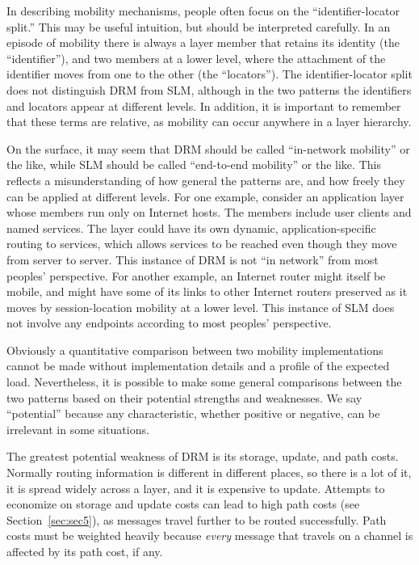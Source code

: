 In describing mobility mechanisms, people often focus on the
``identifier-locator split.''
This may be useful intuition, but should be interpreted carefully.
In an episode of mobility there is always a layer member that retains
its identity (the ``identifier''), and two members at a lower level,
where the attachment of the identifier moves from one to the other
(the ``locators'').
The identifier-locator split
does not distinguish DRM from SLM, although in the two patterns
the identifiers and locators appear at different levels.
In addition, it is important to remember that these terms are
relative, as mobility can occur anywhere in a layer hierarchy. 

On the surface, it may seem that DRM should be called ``in-network
mobility'' or the like, while SLM should be called ``end-to-end mobility''
or the like.
This reflects a misunderstanding of how general the patterns are,
and how freely they can be applied at different levels.
For one example, consider an application layer whose members run
only on Internet
hosts.
The members include user clients and named services.
The layer could have its own dynamic,
application-specific routing to services,
which allows services to be reached even though they move from server
to server.
This instance of DRM is not ``in network'' from most peoples' perspective.
For another example, an Internet router might itself be mobile,
and might have some of its links to other Internet routers
preserved as it moves by session-location
mobility at a lower level.
This instance of SLM does not involve any endpoints according to most
peoples' perspective.

Obviously a quantitative comparison between two mobility implementations
cannot be made without implementation details and a profile of the
expected load.
Nevertheless, it is possible to make some general comparisons
between the two patterns based on their potential strengths and 
weaknesses.
We say ``potential'' because any characteristic, whether positive or
negative, can be irrelevant in some situations.

The greatest potential
weakness of DRM is its storage, update, and path costs.
Normally routing information is different in different places,
so there is a lot of it, it is spread widely across a layer, and it
is expensive to update.
Attempts to economize on storage and update costs can lead to high
path costs (see Section~\ref{sec:sec5}), as messages travel further
to be routed successfully.
Path costs must be weighted heavily because {\it every}
message that travels on a
channel is affected by its path cost, if any.

